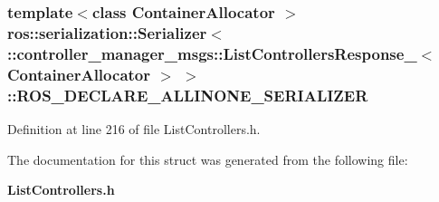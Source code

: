 \subsubsection[{\-R\-O\-S\-\_\-\-D\-E\-C\-L\-A\-R\-E\-\_\-\-A\-L\-L\-I\-N\-O\-N\-E\-\_\-\-S\-E\-R\-I\-A\-L\-I\-Z\-E\-R}]{\setlength{\rightskip}{0pt plus 5cm}template$<$class Container\-Allocator $>$ ros\-::serialization\-::\-Serializer$<$ \-::{\bf controller\-\_\-manager\-\_\-msgs\-::\-List\-Controllers\-Response\-\_\-}$<$ \-Container\-Allocator $>$ $>$\-::{\bf \-R\-O\-S\-\_\-\-D\-E\-C\-L\-A\-R\-E\-\_\-\-A\-L\-L\-I\-N\-O\-N\-E\-\_\-\-S\-E\-R\-I\-A\-L\-I\-Z\-E\-R}}\label{structros_1_1serialization_1_1Serializer_3_01_1_1controller__manager__msgs_1_1ListControllersRes9a596dc63f34a72109819bdf9eaad296_aa87e895710569c96b08773f193783d88}


\-Definition at line 216 of file \-List\-Controllers.\-h.



\-The documentation for this struct was generated from the following file\-:\begin{DoxyCompactItemize}
\item 
{\bf \-List\-Controllers.\-h}\end{DoxyCompactItemize}
